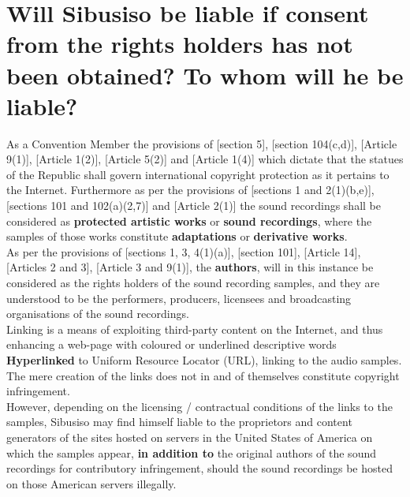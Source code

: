 \documentclass[11pt]{article}
\begin{document}
\section{Will Sibusiso be liable if consent from the rights holders has not been obtained? To whom will he be liable?}
\label{sec:org273c639}

As a Convention Member the provisions of [section 5]\cite{rsa78_copyrightact},
[section 104(c,d)]\cite{usa76_title17_us_copyright_act}, [Article
9(1)]\cite{wto17_trips}, [Article 1(2)]\cite{eurlex00_elec_commerce}, [Article
5(2)]\cite{wipo86_berne} and [Article 1(4)]\cite{wipo96_copyright_treaty} which
dictate that the statues of the Republic shall govern international copyright
protection as it pertains to the Internet. Furthermore as per the provisions of
[sections 1 and 2(1)(b,e)]\cite{rsa78_copyrightact}, [sections 101 and
102(a)(2,7)]\cite{usa76_title17_us_copyright_act} and [Article
2(1)]\cite{wipo86_berne} the sound recordings shall be considered as \textbf{protected
artistic works} or \textbf{sound recordings}, where the samples of those works
constitute \textbf{adaptations} or \textbf{derivative works}.\\

As per the provisions of [sections 1, 3, 4(1)(a)]\cite{rsa78_copyrightact},
[section 101]\cite{usa76_title17_us_copyright_act}, [Article 14]\cite{wto17_trips},
[Articles 2 and 3]\cite{wipo96_wppt}, [Article 3 and 9(1)]\cite{wipo86_berne}, the
\textbf{authors}, will in this instance be considered as the rights holders of the
sound recording samples, and they are understood to be the performers,
producers, licensees and broadcasting organisations of the sound recordings.\\

Linking is a means of exploiting third-party content on the Internet, and thus
enhancing a web-page with coloured or underlined descriptive words \textbf{Hyperlinked}
to Uniform Resource Locator (URL), linking to the audio samples. The mere
creation of the links does not in and of themselves constitute copyright
infringement.\\

However, depending on the licensing / contractual conditions of the links to the
samples, Sibusiso may find himself liable to the proprietors and content
generators of the sites hosted on servers in the United States of America on
which the samples appear, \textbf{in addition to} the original authors of the sound
recordings for contributory infringement, should the sound recordings be hosted
on those American servers illegally.
\end{document}
